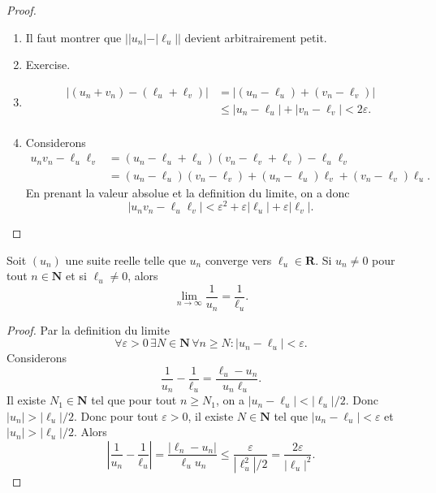 \begin{proof}
\begin{enumerate}
\item Il faut montrer que $||u_{n}|-|\ell _{u}||$ devient arbitrairement petit. 
\item Exercise.
\item
\begin{align*}
|(u_{n}+v_{n})-(\ell _{u}+\ell _{v})| & =|(u_{n}-\ell _{u})+(v_{n}-\ell _{v})| \\
 & \le |u_{n}-\ell _{u}|+|v_{n}-\ell _{v}|<2\varepsilon. \\
\end{align*}
\item Considerons
\begin{align*}
u_{n}v_{n}-\ell _{u}\ell _{v} & =(u_{n}-\ell _{u}+\ell _{u})(v_{n}-\ell _{v}+\ell _{v})-\ell _{u}\ell _{v} \\
 & =(u_{n}-\ell _{u})(v_{n}-\ell _{v})+(u_{n}-\ell _{u})\ell _{v}+(v_{n}-\ell _{v})\ell _{u}.
\end{align*}
En prenant la valeur absolue et la definition du limite, on a donc
$$
|u_{n}v_{n}-\ell _{u}\ell _{v}|< \varepsilon^{2}+\varepsilon |\ell _{u}|+\varepsilon |\ell _{v}|.
$$
\end{enumerate}
\end{proof}
\begin{proposition}
Soit $(u_{n})$ une suite reelle telle que $u_{n}$ converge vers $\ell _{u}\in \mathbf{R}$. Si $u_{n}\neq 0$ pour tout $n\in \mathbf{N}$ et si $\ell _{u}\neq 0$, alors
$$
\lim_{ n \to \infty } \frac{1}{u_{n}}=\frac{1}{\ell _{u}}.
$$
\end{proposition}
\begin{proof}
Par la definition du limite
$$
\forall\varepsilon>0\,\exists N\in \mathbf{N}\,\forall n\ge N:|u_{n}-\ell _{u}|<\varepsilon.
$$
Considerons 
$$
\frac{1}{u_{n}}-\frac{1}{\ell _{u}}=\frac{\ell _{u}-u_{n}}{u_{n}\ell _{u}}.
$$
Il existe $N_{1}\in \mathbf{N}$ tel que pour tout $n\ge N_{1}$, on a $|u_{n}-\ell _{u}|<|\ell _{u}|/2$. Donc $|u_{n}|>|\ell _{u}|/2$. Donc pour tout $\varepsilon>0$, il existe $N\in \mathbf{N}$ tel que $|u_{n}-\ell _{u}|<\varepsilon$ et $|u_{n}|> |\ell _{u}|/2$. Alors
$$
\left\lvert  \frac{1}{u_{n}}-\frac{1}{\ell _{u}}  \right\rvert =\frac{|\ell _{n}-u_{n}|}{\ell _{u}u_{n}}\le \frac{\varepsilon}{|\ell_{u}^{2}|/2}=\frac{2\varepsilon}{|\ell _{u}|^{2}}.
$$
\end{proof}
